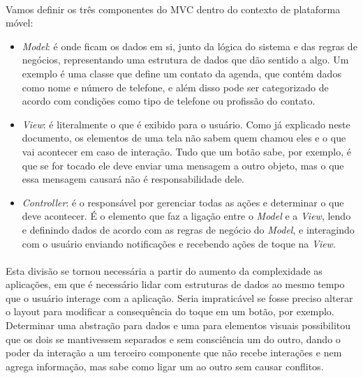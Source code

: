 \documentclass[a4paper,12pt,brazil,doubleside]{book}
\begin{document}
\begin{singlespace}
\paragraph{}Vamos definir os três componentes do MVC dentro do contexto de plataforma móvel:
\begin{itemize}
\item \emph{Model}: é onde ficam os dados em si, junto da lógica do sistema e das regras de negócios, representando uma estrutura de dados que dão sentido a algo. Um exemplo é uma classe que define um contato da agenda, que contém dados como nome e número de telefone, e além disso pode ser categorizado de acordo com condições como tipo de telefone ou profissão do contato.
\item \emph{View}: é literalmente o que é exibido para o usuário. Como já explicado neste documento, os elementos de uma tela não sabem quem chamou eles e o que vai acontecer em caso de interação. Tudo que um botão sabe, por exemplo, é que se for tocado ele deve enviar uma mensagem a outro objeto, mas o que essa mensagem causará não é responsabilidade dele.
\item \emph{Controller}: é o responsável por gerenciar todas as ações e determinar o que deve acontecer. É o elemento que faz a ligação entre o \emph{Model} e a \emph{View}, lendo e definindo dados de acordo com as regras de negócio do \emph{Model}, e interagindo com o usuário enviando notificações e recebendo ações de toque na \emph{View}.
\end{itemize}
\paragraph{}Esta divisão se tornou necessária a partir do aumento da complexidade as aplicações, em que é necessário lidar com estruturas de dados ao mesmo tempo que o usuário interage com a aplicação. Seria impraticável se fosse preciso alterar o layout para modificar a consequência do toque em um botão, por exemplo. Determinar uma abstração para dados e uma para elementos visuais possibilitou que os dois se mantivessem separados e sem consciência um do outro, dando o poder da interação a um terceiro componente que não recebe interações e nem agrega informação, mas sabe como ligar um ao outro sem causar conflitos.

\end{singlespace}




\singlespace
{}
\cleardoublepage
\thispagestyle{empty}
{}


\doublespace
\end{document}
